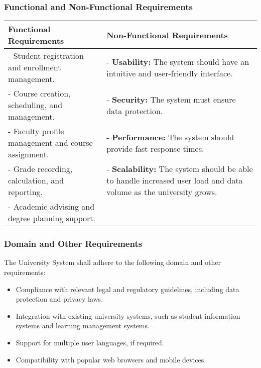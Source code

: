 \documentclass[12pt]{article}
\begin{document}
		\subsubsection{Functional and Non-Functional Requirements}
		\begin{center}
			\normalsize
			{\begin{tabular}{|p{0.45\textwidth}|p{}|}
					\hline
					\textbf{Functional Requirements} & \textbf{Non-Functional Requirements} \\
					\hline
					- Student registration and enrollment management. & - \textbf{Usability:} The system should have an intuitive and user-friendly interface. \\[0.1in]
					
					- Course creation, scheduling, and management. & - \textbf{Security:} The system must ensure data protection. \\[0.1in]
					
					- Faculty profile management and course assignment. & - \textbf{Performance:} The system should provide fast response times. \\[0.1in]
					
					- Grade recording, calculation, and reporting. & - \textbf{Scalability:} The system should be able to handle increased user load and data volume as the university grows. \\[0.1in]
					
					- Academic advising and degree planning support. & \\[0.1in]
					\hline
			\end{tabular}}
		\end{center}
		
		
	
	\subsubsection{Domain and Other Requirements}
	The University System shall adhere to the following domain and other requirements:
	\begin{itemize}
		\item Compliance with relevant legal and regulatory guidelines, including data protection and privacy laws.
		\item Integration with existing university systems, such as student information systems and learning management systems.
		\item Support for multiple user languages, if required.
		\item Compatibility with popular web browsers and mobile devices.
	\end{itemize}
\end{document}
